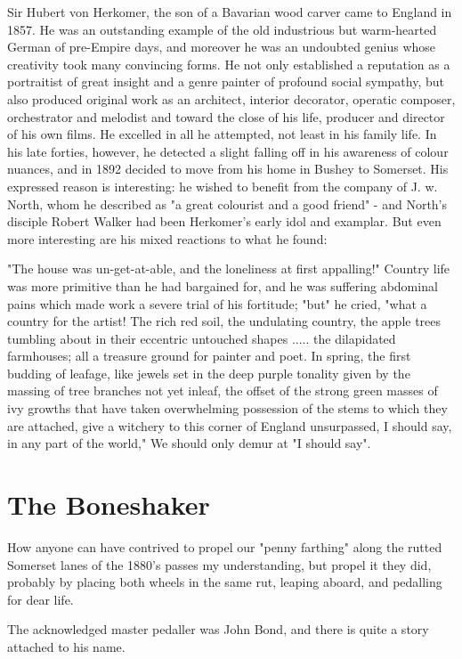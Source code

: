 Sir Hubert von Herkomer, the son of a Bavarian wood carver came to England in 1857. He was an outstanding example of the old industrious but warm-hearted German of pre-Empire days, and moreover he was an undoubted genius whose creativity took many convincing forms. He not only established a reputation as a portraitist of great insight and a genre painter of profound social sympathy, but also produced original work as an architect, interior decorator, operatic composer, orchestrator and melodist and toward the close of his life, producer and director of his own films. He excelled in all he attempted, not least in his family life. In his late forties, however, he detected a slight falling off in his awareness of colour nuances, and in 1892 decided to move from his home in Bushey to Somerset. His expressed reason is interesting: he wished to benefit from the company of J. w.  North, whom he described as "a great colourist and a good friend" - and North's disciple Robert Walker had been Herkomer's early idol and examplar. But even more interesting are his mixed reactions to what he found:

"The house was un-get-at-able, and the loneliness at first appalling!" Country life was more primitive than he had bargained for, and he was suffering abdominal pains which made work a severe trial of his fortitude; "but" he cried,
"what a country for the artist! 	 The rich red soil, the undulating country, the apple trees tumbling about in their eccentric untouched shapes ..... the dilapidated farmhouses; all a treasure ground for painter and poet. In spring, the first budding of leafage, like jewels set in the deep purple tonality given by the massing of tree branches not yet inleaf, the offset of the strong green masses of ivy growths that have taken overwhelming possession of the stems to which they are attached, give a witchery to this corner of England unsurpassed,
I should say, in any part of the world,"
We should only demur at "I should say".
 
\section{The Boneshaker}

How anyone can have contrived to propel our "penny farthing" along the rutted Somerset lanes of the 1880's passes my understanding, but propel it they did, probably by placing both wheels in the same rut, leaping aboard, and pedalling for dear life.

The acknowledged master pedaller was John Bond, and there is quite a story attached to his name. 

